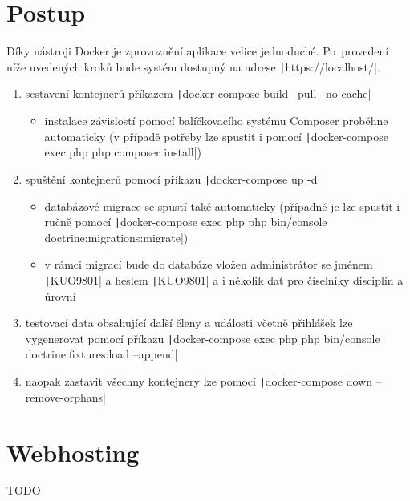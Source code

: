 \section{Postup}\label{deploy-steps}
Díky nástroji Docker je zprovoznění aplikace velice jednoduché. Po~provedení níže uvedených kroků bude systém dostupný na adrese \texttt|https://localhost/|.

\begin{enumerate}
	\item sestavení kontejnerů příkazem \texttt|docker-compose build --pull --no-cache|
	\begin{itemize}
		\item instalace závislostí pomocí balíčkovacího systému Composer proběhne automaticky (v případě potřeby lze spustit i pomocí \texttt|docker-compose exec php php composer install|)
	\end{itemize}
	\item spuštění kontejnerů pomocí příkazu \texttt|docker-compose up -d|
	\begin{itemize}
		\item databázové migrace se spustí také automaticky (případně je lze spustit i ručně pomocí \texttt|docker-compose exec php php bin/console doctrine:migrations:migrate|)
		\item v rámci migrací bude do databáze vložen administrátor se jménem \texttt|KUO9801| a heslem \texttt|KUO9801| a i několik dat pro číselníky disciplín a úrovní
	\end{itemize}
	\item testovací data obsahující další členy a události včetně přihlášek lze vygenerovat pomocí příkazu \texttt|docker-compose exec php php bin/console doctrine:fixtures:load --append|
	\item naopak zastavit všechny kontejnery lze pomocí \texttt|docker-compose down --remove-orphans|
\end{enumerate}

\section{Webhosting}
TODO
